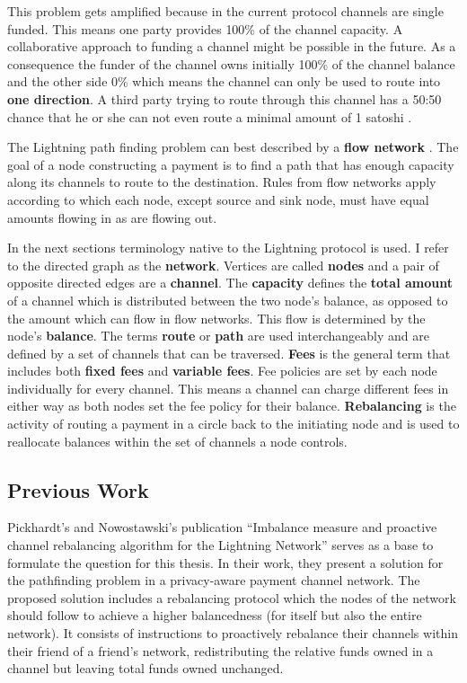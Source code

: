 \documentclass[final]{fhnwreport}       %
\begin{document}
This problem gets amplified because in the current protocol channels are single funded. This means one party provides 100\% of the channel capacity. A collaborative approach to funding a channel might be possible in the future. As a consequence the funder of the channel owns initially 100\% of the channel balance and the other side 0\% which means the channel can only be used to route into \textbf{one direction}. A third party trying to route through this channel has a 50:50 chance that he or she can not even route a minimal amount of 1 satoshi . 

The Lightning path finding problem can best described by a \textbf{flow network} . The goal of a node constructing a payment is to find a path that has enough capacity along its channels to route to the destination. Rules from flow networks apply according to which each node, except source and sink node, must have equal amounts flowing in as are flowing out. 

In the next sections terminology native to the Lightning protocol is used. I refer to the directed graph as the \textbf{network}. Vertices are called \textbf{nodes} and a pair of opposite directed edges are a \textbf{channel}. The \textbf{capacity} defines the \textbf{total amount} of a channel which is distributed between the two node's balance, as opposed to the amount which can flow in flow networks. This flow is determined by the node's \textbf{balance}. The terms \textbf{route} or \textbf{path} are used interchangeably and are defined by a set of channels that can be traversed. \textbf{Fees} is the general term that includes both \textbf{fixed fees} and \textbf{variable fees}. Fee policies are set by each node individually for every channel. This means a channel can charge different fees in either way as both nodes set the fee policy for their balance. \textbf{Rebalancing} is the activity of routing a payment in a circle back to the initiating node and is used to reallocate balances within the set of channels a node controls.   

\subsection{Previous Work}
Pickhardt's and Nowostawski's publication ``Imbalance measure and proactive channel rebalancing algorithm for the Lightning Network'' \citep{pickhardt_imbalance_2019} serves as a base to formulate the question for this thesis. In their work, they present a solution for the pathfinding problem in a privacy-aware payment channel network. The proposed solution includes a rebalancing protocol which the nodes of the network should follow to achieve a higher balancedness (for itself but also the entire network). It consists of instructions to proactively rebalance their channels within their friend of a friend's network, redistributing the relative funds owned in a channel but leaving total funds owned unchanged.
\end{document}
